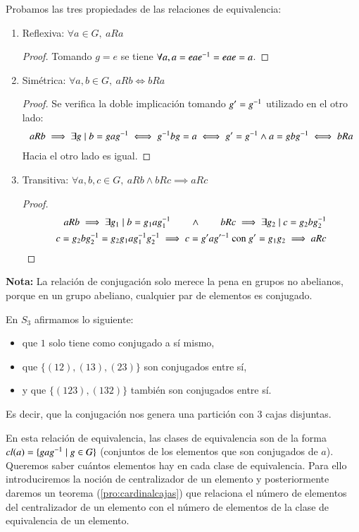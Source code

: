 Probamos las tres propiedades de las relaciones de equivalencia:
\begin{enumerate}
	\item Reflexiva: $\forall a \in G,\ aRa$
	\begin{proof}
		Tomando $g = e$ se tiene $\forall a, a = eae^{-1} = eae = a$.
	\end{proof}
	\item Simétrica: $\forall a,b \in G,\ aRb \iff bRa$
	\begin{proof}
		Se verifica la doble implicación tomando $g' = g^{-1}$ utilizado en el otro lado:
		\begin{align*}
			aRb \implies \exists g \mid b = gag^{-1} \iff g^{-1}bg = a \iff g' = g^{-1} \land a = gbg^{-1} \iff bRa
		\end{align*}
		Hacia el otro lado es igual.
	\end{proof}
	\item Transitiva: $\forall a,b,c \in G,\ aRb \land bRc \implies aRc$
	\begin{proof}
		\begin{align*}
		aRb \implies \exists g_1 \mid b = g_1ag_1^{-1} \qquad\land \qquad bRc \implies \exists g_2 \mid c = g_2bg_2^{-1} \\
		c = g_2bg_2^{-1} = g_2g_1ag_1^{-1}g_2^{-1} \implies c = g'ag'^{-1} \text{ con } g' = g_1 g_2 \implies aRc
		\end{align*}
	\end{proof}
\end{enumerate}

\textbf{Nota:} La relación de conjugación solo merece la pena en grupos no abelianos, porque en un grupo abeliano, cualquier par de elementos es conjugado.

\begin{ej}
	En $S_3$ afirmamos lo siguiente:
	\begin{itemize}
		\item que $1$ solo tiene como conjugado a sí mismo,
		\item que $\{(12),(13),(23)\}$ son conjugados entre sí,
		\item y que $\{(123),(132)\}$ también son conjugados entre sí.
	\end{itemize}
	Es decir, que la conjugación nos genera una partición con 3 cajas disjuntas.
\end{ej}

En esta relación de equivalencia, las clases de equivalencia son de la forma $cl(a) = \{gag^{-1} \mid g \in G\}$ (conjuntos de los elementos que son conjugados de $a$). Queremos saber cuántos elementos hay en cada clase de equivalencia. Para ello introduciremos la noción de centralizador de un elemento y posteriormente daremos un teorema (\autoref{pro:cardinalcajas}) que relaciona el número de elementos del centralizador de un elemento con el número de elementos de la clase de equivalencia de un elemento.

